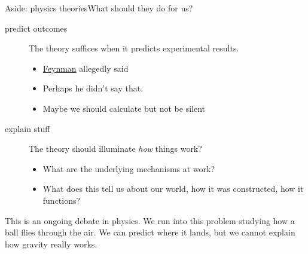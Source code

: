 \begin{frame}{Aside: physics theories}{What should they do for us?}
\begin{description}
    \item[predict outcomes]  The theory suffices when it predicts experimental results.  
    \begin{itemize}
        \item \href{https://en.wikipedia.org/wiki/Richard_Feynman}{Feynman} allegedly said 
        \item Perhaps he didn't say that. 
        \item Maybe we should calculate but not be silent 
    \end{itemize}
    \item[explain stuff]  The theory should illuminate \emph{how} things work?
    \begin{itemize}
        \item What are the underlying mechanisms at work?
        \item What does this tell us about our world, how it was constructed, how it functions?
    \end{itemize}
\end{description}
This is an ongoing debate in physics.  We run into this problem studying how a ball flies through the air.  We can predict where it lands, but we cannot explain how gravity really works. 
\end{frame}
